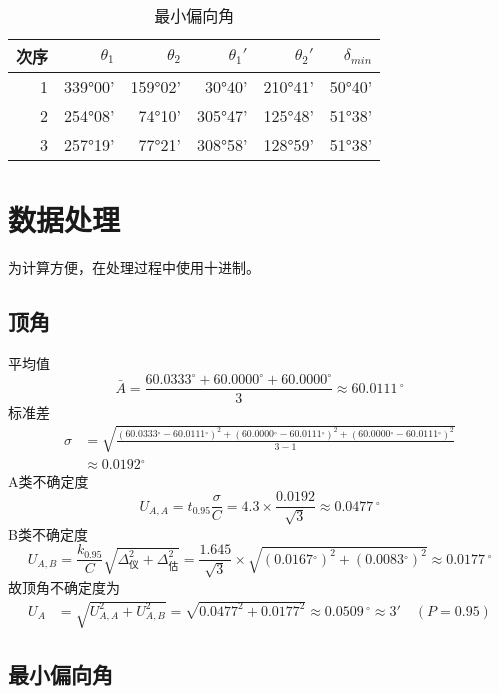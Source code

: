 \documentclass{article}
\begin{document}
  
\begin{table}[htbp]
    \centering
    \caption{最小偏向角}
      \begin{tabular}{|r|r|r|r|r|r|}
      \hline
      \multicolumn{1}{|l|}{次序} & $\theta_1$     & $\theta_2$     & $\theta_1'$    & $\theta_2'$    & $\delta_{min}$ \bigstrut\\
      \hline
      1     & 339°00' & 159°02' & 30°40' & 210°41' & 50°40' \bigstrut\\
      \hline
      2     & 254°08' & 74°10' & 305°47' & 125°48' & 51°38' \bigstrut\\
      \hline
      3     & 257°19' & 77°21' & 308°58' & 128°59' & 51°38' \bigstrut\\
      \hline
      \end{tabular}%

  \end{table}%
  

\section*{数据处理}
为计算方便，在处理过程中使用十进制。
\subsection*{顶角}
平均值
$$
\bar{A}=\frac{60.0333\mathrm{^{\circ}}+60.0000\mathrm{^{\circ}}+60.0000\mathrm{^{\circ}}}{3}\approx60.0111\,\mathrm{^{\circ}}
$$
标准差
$$
\begin{aligned}
\sigma&=\sqrt{\frac{(60.0333\mathrm{^{\circ}}-60.0111\mathrm{^{\circ}})^2+(60.0000\mathrm{^{\circ}}-60.0111\mathrm{^{\circ}})^2+(60.0000\mathrm{^{\circ}}-60.0111\mathrm{^{\circ}})^2}{3-1}}\\
&\approx0.0192\mathrm{^{\circ}}
\end{aligned}
$$
A类不确定度
\[U_{A,A}=t_{0.95}\frac{\sigma}{C}=4.3\times\frac{0.0192}{\sqrt{3}}\approx0.0477\,\mathrm{^{\circ}}\]
B类不确定度
$$
U_{A,B}=\frac{k_{0.95}}{C}\sqrt{\Delta_\text{仪}^2+\Delta_\text{估}^2}=\frac{1.645}{\sqrt{3}}\times\sqrt{(0.0167\mathrm{^{\circ}})^2+(0.0083\mathrm{^{\circ}})^2}\approx0.0177\,\mathrm{^{\circ}}
$$
故顶角不确定度为
$$
\begin{aligned}
U_A&=\sqrt{U_{A,A}^2+U_{A,B}^2}=\sqrt{0.0477^2+0.0177^2}\approx0.0509\,\mathrm{^{\circ}}\approx3'\quad(P=0.95)
\end{aligned}
$$


\subsection*{最小偏向角}
\end{document}
